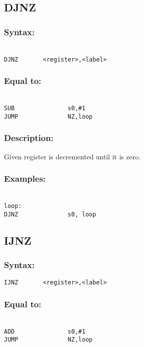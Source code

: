     \subsection{DJNZ}
        \subsubsection{Syntax:}
        {
            ~\\
            \usecodefont        
            \verb'DJNZ       <register>,<label>'
        }
        \subsubsection{Equal to:}
        {
            ~\\
            \usecodefont
            \verb'SUB               s0,#1'\\
            \verb'JUMP              NZ,loop'\\
        }
        \subsubsection{Description:}
            Given register is decremented until it is zero.

        \subsubsection{Examples:}
        {
            ~\\
            \usecodefont
            \verb'loop:             '\\
            \verb'DJNZ              s0, loop'\\
        }

    \subsection{IJNZ}
        \subsubsection{Syntax:}
            \verb'IJNZ       <register>,<label>'

        \subsubsection{Equal to:}
        {
            ~\\
            \usecodefont
            \verb'ADD               s0,#1'\\
            \verb'JUMP              NZ,loop'\\
        }
